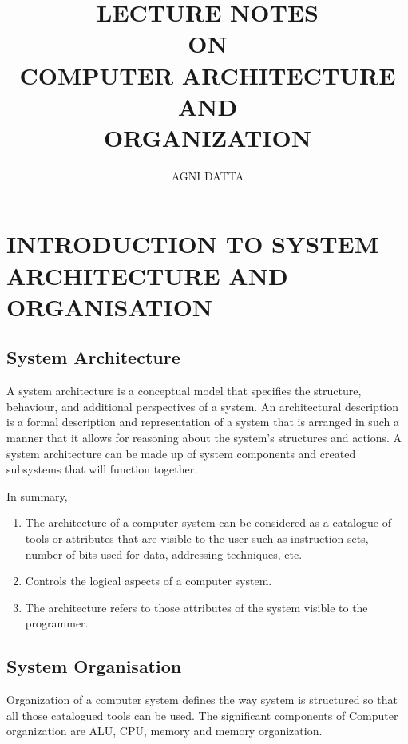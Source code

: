 \documentclass[british]{extreport}
\begin{document}
\title{\noindent \textbf{LECTURE NOTES\\ON\\COMPUTER ARCHITECTURE\\AND\\ORGANIZATION}}
\author{\noindent AGNI DATTA}

\maketitle
\noindent \tableofcontents{}

\chapter{INTRODUCTION TO SYSTEM ARCHITECTURE AND ORGANISATION}

\pagebreak{}

\section{System Architecture}

\noindent A system architecture is a conceptual model that specifies
the structure, behaviour, and additional perspectives of a system.
An architectural description is a formal description and representation
of a system that is arranged in such a manner that it allows for reasoning
about the system's structures and actions. A system architecture can
be made up of system components and created subsystems that will function
together.

\noindent In summary,
\begin{enumerate}
	\item The architecture of a computer system can be considered as a catalogue
	      of tools or attributes that are visible to the user such as instruction
	      sets, number of bits used for data, addressing techniques, etc.
	\item Controls the logical aspects of a computer system.
	\item The architecture refers to those attributes of the system visible
	      to the programmer.
\end{enumerate}

\section{System Organisation}

\noindent Organization of a computer system defines the way system
is structured so that all those catalogued tools can be used. The
significant components of Computer organization are ALU, CPU, memory
and memory organization.
\end{document}
